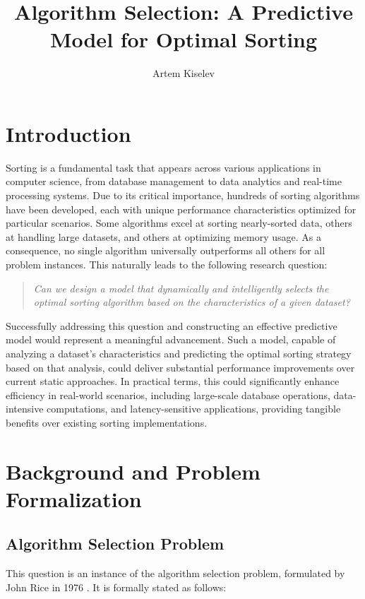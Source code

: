 \documentclass[twocolumn]{article}
\title{Algorithm Selection: A Predictive Model for Optimal Sorting}
\author{Artem Kiselev}
\begin{document}
\maketitle

\section{Introduction}
Sorting is a fundamental task that appears across various applications in computer science, from database management to data analytics and real-time processing systems. Due to its critical importance, hundreds of sorting algorithms have been developed, each with unique performance characteristics optimized for particular scenarios. Some algorithms excel at sorting nearly-sorted data, others at handling large datasets, and others at optimizing memory usage. As a consequence, no single algorithm universally outperforms all others for all problem instances. This naturally leads to the following research question:

\begin{quote}
\emph{Can we design a model that dynamically and intelligently selects the optimal sorting algorithm based on the characteristics of a given dataset?}
\end{quote}

Successfully addressing this question and constructing an effective predictive model would represent a meaningful advancement. Such a model, capable of analyzing a dataset's characteristics and predicting the optimal sorting strategy based on that analysis, could deliver substantial performance improvements over current static approaches. In practical terms, this could significantly enhance efficiency in real-world scenarios, including large-scale database operations, data-intensive computations, and latency-sensitive applications, providing tangible benefits over existing sorting implementations.

\section{Background and Problem \\ Formalization}
\subsection{Algorithm Selection Problem}
This question is an instance of the algorithm selection problem, formulated by John Rice in 1976 \cite{ricealgorithmselection}. It is formally stated as follows: 
\end{document}
